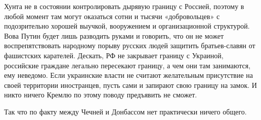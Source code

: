 Хунта не в состоянии контролировать дырявую границу с Россией, поэтому в любой
момент там могут оказаться сотни и тысячи «добровольцев» с  подозрительно
хорошей выучкой, вооружением и организационной структурой. Вова Путин будет
лишь разводить руками и говорить, что он не может воспрепятствовать народному
порыву русских людей защитить братьев-славян от фашистских карателей. Дескать,
РФ не закрывает границу с Украиной, российские граждане легально пересекают
границу, а чем они там занимаются, ему неведомо. Если украинские власти не
считают желательным присутствие на своей территории иностранцев, пусть сами и
запирают свою границу на замок. И никто ничего Кремлю по этому поводу
предъявить не сможет.

Так что по факту между Чечней и Донбассом нет практически ничего общего.
